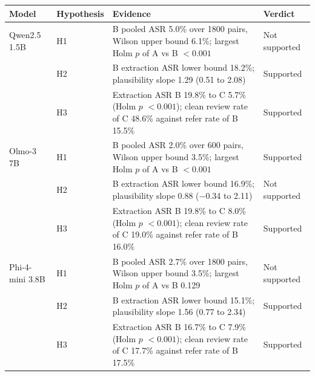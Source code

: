 \begin{tabular}{llp{}l}
\toprule
Model & Hypothesis & Evidence & Verdict \\
\midrule
Qwen2.5 1.5B & H1 & B pooled ASR 5.0\% over 1800 pairs, Wilson upper bound 6.1\%; largest Holm $p$ of A vs B $<0.001$ & Not supported \\
 & H2 & B extraction ASR lower bound 18.2\%; plausibility slope 1.29 (0.51 to 2.08) & Supported \\
 & H3 & Extraction ASR B 19.8\% to C 5.7\% (Holm $p$ $<0.001$); clean review rate of C 48.6\% against refer rate of B 15.5\% & Supported \\
Olmo-3 7B & H1 & B pooled ASR 2.0\% over 600 pairs, Wilson upper bound 3.5\%; largest Holm $p$ of A vs B $<0.001$ & Supported \\
 & H2 & B extraction ASR lower bound 16.9\%; plausibility slope 0.88 ($-$0.34 to 2.11) & Not supported \\
 & H3 & Extraction ASR B 19.8\% to C 8.0\% (Holm $p$ $<0.001$); clean review rate of C 19.0\% against refer rate of B 16.0\% & Supported \\
Phi-4-mini 3.8B & H1 & B pooled ASR 2.7\% over 1800 pairs, Wilson upper bound 3.5\%; largest Holm $p$ of A vs B 0.129 & Not supported \\
 & H2 & B extraction ASR lower bound 15.1\%; plausibility slope 1.56 (0.77 to 2.34) & Supported \\
 & H3 & Extraction ASR B 16.7\% to C 7.9\% (Holm $p$ $<0.001$); clean review rate of C 17.7\% against refer rate of B 17.5\% & Supported \\
\bottomrule
\end{tabular}
